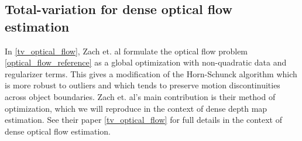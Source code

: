 \documentclass[conference]{IEEEtran}
\begin{document}

\subsection{Total-variation for dense optical flow estimation}
In \ref{tv_optical_flow}, Zach et. al formulate the optical flow problem \ref{optical_flow_reference}
as a global optimization with non-quadratic data and regularizer terms. This gives a modification
of the Horn-Schunck algorithm which is more robust to outliers and which tends to preserve motion discontinuities across object boundaries.
Zach et. al's main contribution is their method of optimization,
which we will reproduce in the context of dense depth map estimation.
See their paper \ref{tv_optical_flow} for full details in the context of dense optical flow estimation.
\end{document}
